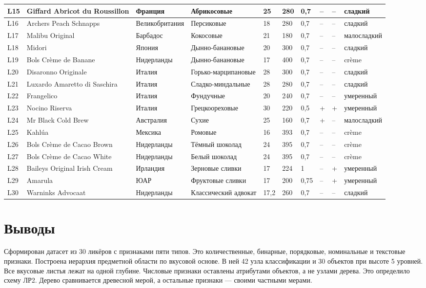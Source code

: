 {\begin{longtable}{|S{0.7cm}|S{4.0cm}|S{2.3cm}|S{2.8cm}|S{0.7cm}|S{0.7cm}|S{0.7cm}|S{0.35cm}|S{0.35cm}|S{1.9cm}|}
L15 & Giffard Abricot du Roussillon & Франция & Абрикосовые & 25 & 280 & 0,7 & -- & -- & сладкий \\ \hline
L16 & Archers Peach Schnapps & Великобритания & Персиковые & 18 & 280 & 0,7 & -- & -- & сладкий \\ \hline
L17 & Malibu Original & Барбадос & Кокосовые & 21 & 180 & 0,7 & -- & -- & малосладкий \\ \hline
L18 & Midori & Япония & Дынно-банановые & 20 & 300 & 0,7 & -- & -- & сладкий \\ \hline
L19 & Bols Cr\`eme de Banane & Нидерланды & Дынно-банановые & 17 & 400 & 0,7 & -- & -- & cr\`eme \\ \hline
L20 & Disaronno Originale & Италия & Горько-марципановые & 28 & 300 & 0,7 & -- & -- & сладкий \\ \hline
L21 & Luxardo Amaretto di Saschira & Италия & Сладко-миндальные & 28 & 280 & 0,7 & -- & -- & сладкий \\ \hline
L22 & Frangelico & Италия & Фундучные & 20 & 240 & 0,7 & -- & -- & умеренный \\ \hline
L23 & Nocino Riserva & Италия & Грецкоореховые & 30 & 220 & 0,5 & + & + & умеренный \\ \hline
L24 & Mr Black Cold Brew & Австралия & Сухие & 25 & 160 & 0,7 & + & -- & малосладкий \\ \hline
L25 & Kahl\'ua & Мексика & Ромовые & 16 & 393 & 0,7 & -- & -- & cr\`eme \\ \hline
L26 & Bols Cr\`eme de Cacao Brown & Нидерланды & Тёмный шоколад & 24 & 395 & 0,7 & -- & -- & cr\`eme \\ \hline
L27 & Bols Cr\`eme de Cacao White & Нидерланды & Белый шоколад & 24 & 395 & 0,7 & -- & -- & cr\`eme \\ \hline
L28 & Baileys Original Irish Cream & Ирландия & Зерновые сливки & 17 & 224 & 1 & -- & + & умеренный \\ \hline
L29 & Amarula & ЮАР & Фруктовые сливки & 17 & 200 & 0,75 & -- & + & умеренный \\ \hline
L30 & Warninks Advocaat & Нидерланды & Классический адвокат & 17,2 & 260 & 0,7 & -- & -- & сладкий \\ \hline
\end{longtable}
}

\section*{Выводы}

Сформирован датасет из 30 ликёров с признаками пяти типов. Это количественные, бинарные, порядковые, номинальные и текстовые признаки. Построена иерархия предметной области по вкусовой основе. В ней 42 узла классификации и 30 объектов при высоте 5 уровней. Все вкусовые листья лежат на одной глубине. Числовые признаки оставлены атрибутами объектов, а не узлами дерева. Это определило схему ЛР2. Дерево сравнивается древесной мерой, а остальные признаки --- своими частными мерами.
